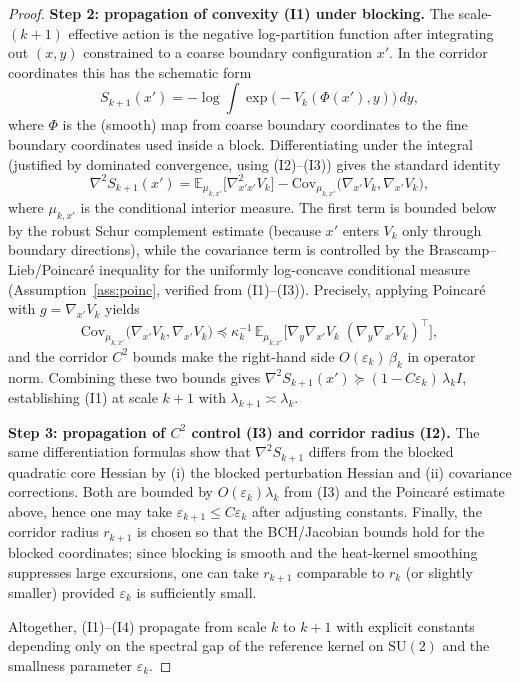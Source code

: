 \documentclass[11pt]{article}
\theoremstyle{definition}
\newcommand{\E}{\mathbb{E}}
\newcommand{\Cov}{\mathrm{Cov}}
\newcommand{\SU}{\mathrm{SU}}
\newcommand{\1}{\mathbf{1}}
\begin{document}
\begin{proof}
\medskip
\noindent\textbf{Step 2: propagation of convexity (I1) under blocking.}
The scale-$(k+1)$ effective action is the negative log-partition function after integrating out $(x,y)$ constrained to a coarse boundary configuration $x'$. In the corridor coordinates this has the schematic form
\[
S_{k+1}(x')=-\log\!\int \exp\big(-V_k(\Phi(x'),y)\big)\,dy,
\]
where $\Phi$ is the (smooth) map from coarse boundary coordinates to the fine boundary coordinates used inside a block.
Differentiating under the integral (justified by dominated convergence, using (I2)--(I3)) gives the standard identity
\[
\nabla^2 S_{k+1}(x')=\E_{\mu_{k,x'}}\big[\nabla^2_{x'x'} V_k\big]-\Cov_{\mu_{k,x'}}\big(\nabla_{x'} V_k,\nabla_{x'} V_k\big),
\]
where $\mu_{k,x'}$ is the conditional interior measure. The first term is bounded below by the robust Schur complement estimate (because $x'$ enters $V_k$ only through boundary directions), while the covariance term is controlled by the Brascamp--Lieb/Poincar\'e inequality for the uniformly log-concave conditional measure (Assumption~\ref{ass:poinc}, verified from (I1)--(I3)). Precisely, applying Poincar\'e with $g=\nabla_{x'}V_k$ yields
\[
\Cov_{\mu_{k,x'}}\big(\nabla_{x'} V_k,\nabla_{x'} V_k\big)\preceq \kappa_k^{-1}\,\E_{\mu_{k,x'}}\big[\nabla_{y}\nabla_{x'}V_k\; (\nabla_{y}\nabla_{x'}V_k)^\top\big],
\]
and the corridor $C^2$ bounds make the right-hand side $O(\varepsilon_k)\,\beta_k$ in operator norm. Combining these two bounds gives
\(\nabla^2 S_{k+1}(x')\succeq (1-C\varepsilon_k)\,\lambda_k I
\), establishing (I1) at scale $k+1$ with $\lambda_{k+1}\asymp \lambda_k$.

\medskip
\noindent\textbf{Step 3: propagation of $C^2$ control (I3) and corridor radius (I2).}
The same differentiation formulas show that $\nabla^2 S_{k+1}$ differs from the blocked quadratic core Hessian by (i) the blocked perturbation Hessian and (ii) covariance corrections. Both are bounded by $O(\varepsilon_k)\lambda_k$ from (I3) and the Poincar\'e estimate above, hence one may take $\varepsilon_{k+1}\le C\varepsilon_k$ after adjusting constants. Finally, the corridor radius $r_{k+1}$ is chosen so that the BCH/Jacobian bounds hold for the blocked coordinates; since blocking is smooth and the heat-kernel smoothing suppresses large excursions, one can take $r_{k+1}$ comparable to $r_k$ (or slightly smaller) provided $\varepsilon_k$ is sufficiently small.

Altogether, (I1)--(I4) propagate from scale $k$ to $k+1$ with explicit constants depending only on the spectral gap of the reference kernel on $\SU(2)$ and the smallness parameter $\varepsilon_k$.
\end{proof}
\end{document}
